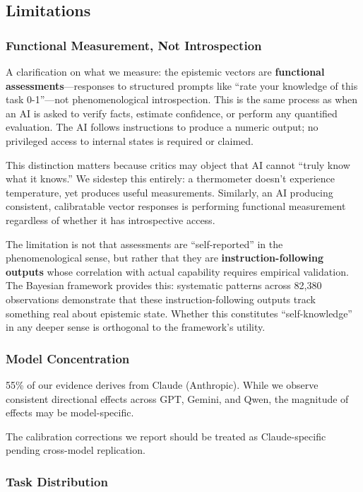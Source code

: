 \subsection{Limitations}

\subsubsection{Functional Measurement, Not Introspection}

A clarification on what we measure: the epistemic vectors are \textbf{functional assessments}---responses to structured prompts like ``rate your knowledge of this task 0-1''---not phenomenological introspection. This is the same process as when an AI is asked to verify facts, estimate confidence, or perform any quantified evaluation. The AI follows instructions to produce a numeric output; no privileged access to internal states is required or claimed.

This distinction matters because critics may object that AI cannot ``truly know what it knows.'' We sidestep this entirely: a thermometer doesn't experience temperature, yet produces useful measurements. Similarly, an AI producing consistent, calibratable vector responses is performing functional measurement regardless of whether it has introspective access.

The limitation is not that assessments are ``self-reported'' in the phenomenological sense, but rather that they are \textbf{instruction-following outputs} whose correlation with actual capability requires empirical validation. The Bayesian framework provides this: systematic patterns across 82,380 observations demonstrate that these instruction-following outputs track something real about epistemic state. Whether this constitutes ``self-knowledge'' in any deeper sense is orthogonal to the framework's utility.

\subsubsection{Model Concentration}

55\% of our evidence derives from Claude (Anthropic). While we observe consistent directional effects across GPT, Gemini, and Qwen, the magnitude of effects may be model-specific.

The calibration corrections we report should be treated as Claude-specific pending cross-model replication.

\subsubsection{Task Distribution}


